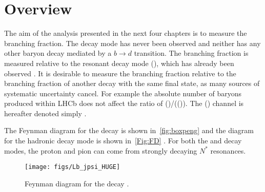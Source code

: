 \section{Overview}
\label{sec:overview}
The aim of the analysis presented in the next four chapters is to measure the \Lbpi branching fraction. The \Lbpi decay mode has never been observed and neither has any other baryon decay mediated by a $b\to d$ transition. The \Lbpi branching fraction is measured relative to the resonant decay mode \Lb\to\proton\pim\jpsi(\to\mumu), which has already been observed \cite{LHCb-PAPER-2014-020}. It is desirable to measure the branching fraction relative to the branching fraction of another decay with the same final state, as many sources of systematic uncertainty cancel. For example the absolute number of \Lb baryons produced within LHCb does not affect the ratio of \BF(\Lbpi)/\BF(\Lb\to\proton\pim\jpsi(\to\mumu)). The \Lb\to\proton\pim\jpsi(\to\mumu) channel is hereafter denoted simply \Lbpijpsi. %

The Feynman diagram for the \Lbpi decay is shown in~\autoref{fig:boxpeng}\protect{} and the diagram for the hadronic decay mode \Lbpijpsi is shown in~\autoref{Fig:FD} .  For both the \Lbpi and \Lbpijpsi decay modes, the proton and pion can come from strongly decaying $N^{*}$ resonances.

\begin{figure}[!ht]%
  \centering
    \texttt{[image: figs/Lb\_jpsi\_HUGE]}%
    \caption{Feynman diagram for the decay \Lbpijpsi.}
  \label{Fig:FD}
\end{figure}

